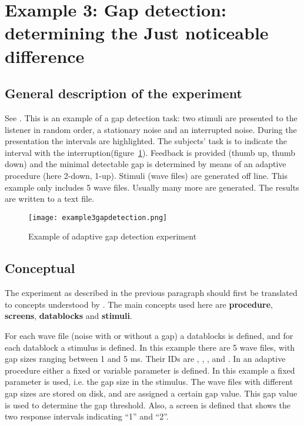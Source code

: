 \newpage
\section{Example 3: Gap detection: determining the Just noticeable difference}


\subsection{General description of the experiment}
See . This is an
example of a gap detection task: two stimuli are presented to the
listener in random order, a stationary noise and an interrupted
noise. During the presentation the intervals are highlighted. The
subjects' task is to indicate the interval with the
interruption(figure~\ref{fig:gapdetection}). Feedback is provided
(thumb up, thumb down) and the minimal detectable gap is
determined by means of an adaptive procedure (here 2-down, 1-up).
Stimuli (wave files) are generated off line. This example only
includes 5 wave files. Usually many more are generated. The
results are written to a text file.


\begin{figure}
 \centering
\texttt{[image: example3gapdetection.png]}
 \caption{Example of adaptive gap detection experiment}
 \label{fig:gapdetection}
\end{figure}

\subsection{Conceptual}
The experiment as described in the previous paragraph should first
be translated to concepts understood by \apex. The main concepts
used here are \textbf{procedure}, \textbf{screens},
\textbf{datablocks} and \textbf{stimuli}.

For each wave file (noise with or without a gap) a \element
{datablocks} is defined, and for each datablock a \element
{stimulus} is defined. In this example there are 5 wave files,
with gap sizes ranging between 1 and 5 ms. Their IDs are
, , , and . In an
adaptive procedure either a fixed or variable parameter is
defined. In this example a fixed parameter is used, i.e. the gap
size in the stimulus. The wave files with different gap sizes are
stored on disk, and are assigned a certain gap value. This gap
value is used to determine the gap threshold. Also, a \element
{screen} is defined that shows the two response intervals
indicating ``1'' and ``2''.

